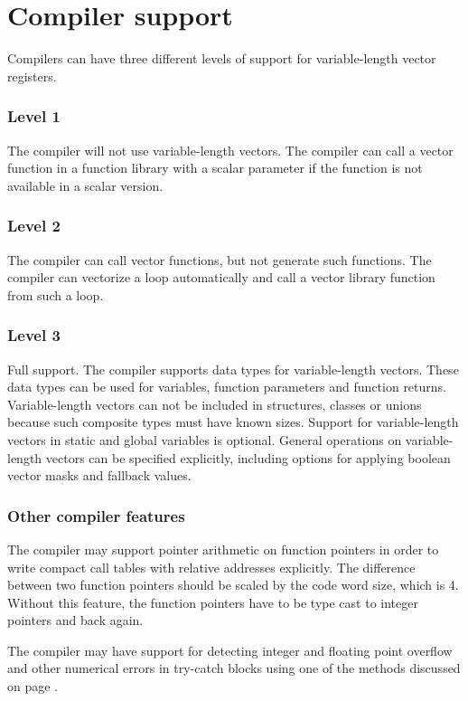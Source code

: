 \documentclass[forwardcom.tex]{subfiles}
\begin{document}
\section{Compiler support} \label{compilerSupport}
Compilers can have three different levels of support for variable-length vector registers. 

\subsubsection{Level 1}
The compiler will not use variable-length vectors. The compiler can call a vector function in a function library with a scalar parameter if the function is not available in a scalar version. 

\subsubsection{Level 2}
The compiler can call vector functions, but not generate such functions. The compiler can vectorize a loop automatically and call a vector library function from such a loop. 

\subsubsection{Level 3}
Full support. The compiler supports data types for variable-length vectors. These data types can be used for variables, function parameters and function returns. Variable-length vectors can not be included in structures, classes or unions because such composite types must have known sizes. Support for variable-length vectors in static and global variables is optional.
\vspace{2mm}
General operations on variable-length vectors can be specified explicitly, including options for applying boolean vector masks and fallback values.

\subsubsection{Other compiler features}
The compiler may support pointer arithmetic on function pointers in order to write compact call tables with relative addresses explicitly. The difference between two function pointers should be scaled by the code word size, which is 4. Without this feature, the function pointers have to be type cast to integer pointers and back again. 

\vspace{2mm}
The compiler may have support for detecting integer and floating point overflow and other numerical errors in try-catch blocks using one of the methods discussed on page \pageref{integerOverflowDetection}.
\end{document}
